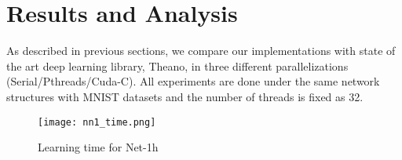 \section{Results and Analysis}
\label{Results}


As described in previous sections, we compare our implementations with state of the art deep learning library, Theano, in three different parallelizations (Serial/Pthreads/Cuda-C). All experiments are done under the same network structures with MNIST datasets and the number of threads is fixed as 32.

\begin{figure}[ht]
\begin{center}
\centerline{\texttt{[image: nn1\_time.png]}}
\caption{Learning time for Net-1h}
\label{fig:nn1_time}
\end{center}
\vskip -0.4in
\end{figure}

